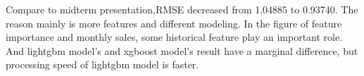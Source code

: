 \documentclass{tikzposter} %
\begin{document}
\begin{columns}
{
\begin{description}


  \item
  Compare to midterm presentation,RMSE decreased from 1.04885 to 0.93740. The \\
reason mainly is more features and different modeling. In the figure of feature \\
importance and monthly sales, some historical feature play an important role. \\
And lightgbm model’s and xgboost model’s result have a marginal difference, but \\
processing speed of lightgbm model is faster.
\end{description}
}





\end{columns}


\end{document}
